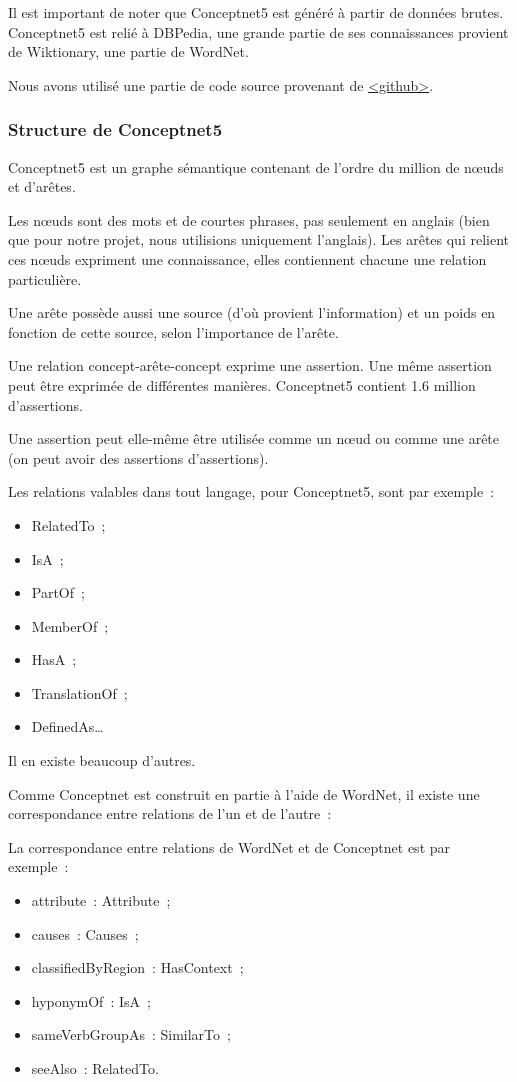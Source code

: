 \documentclass[a4paper, 12pt]{article}
\begin{document}
Il est important de noter que Conceptnet5 est généré à partir de données brutes. Conceptnet5 est relié à DBPedia, une grande partie de ses connaissances provient de Wiktionary, une partie de WordNet.

Nous avons utilisé une partie de code source provenant de \href{https://github.com/commonsense/conceptnet5}{<github>}.


\subsubsection{Structure de Conceptnet5}

Conceptnet5 est un graphe sémantique contenant de l'ordre du million de nœuds et d'ar\^etes.

Les n\oe{}uds sont des mots et de courtes phrases, pas seulement en anglais (bien que pour notre projet, nous utilisions uniquement l'anglais). Les arêtes qui relient ces n\oe{}uds expriment une connaissance, elles contiennent chacune une relation particulière.

Une arête possède aussi une source (d'où provient l'information) et un poids en fonction de cette source, selon l'importance de l'arête.

Une relation concept-arête-concept exprime une assertion. Une même assertion peut être exprimée de différentes manières. Conceptnet5 contient 1.6 million d'assertions.

Une assertion peut elle-même être utilisée comme un n\oe{}ud ou comme une arête (on peut avoir des assertions d'assertions).

Les relations valables dans tout langage, pour Conceptnet5, sont par exemple~:
\begin{itemize}
 \item RelatedTo~;
 \item IsA~;
 \item PartOf~;
 \item MemberOf~;
 \item HasA~;
 \item TranslationOf~;
 \item DefinedAs\ldots{}
\end{itemize}

Il en existe beaucoup d'autres.

Comme Conceptnet est construit en partie à l'aide de WordNet, il existe une correspondance entre relations de l'un et de l'autre~:

La correspondance entre relations de WordNet et de Conceptnet est par exemple~:
\begin{itemize}
 \item attribute~: Attribute~;
 \item causes~: Causes~;
 \item classifiedByRegion~: HasContext~;
 \item hyponymOf~: IsA~;
 \item sameVerbGroupAs~: SimilarTo~;
 \item seeAlso~: RelatedTo.
\end{itemize}
\end{document}
